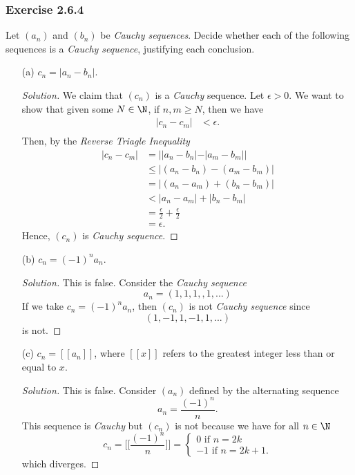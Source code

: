 \subsubsection{Exercise 2.6.4} Let \((a_n)\) and \((b_n)\) be \textit{Cauchy sequences}. Decide whether each of the following sequences is a \textit{Cauchy sequence}, justifying each conclusion.
\begin{enumerate}
    \item[(a)] \( c_n = |a_n - b_n|.\)
        \begin{proof}[Solution]
        We claim that \((c_n)\) is a \textit{Cauchy} sequence. Let \(\epsilon > 0 \). We want to show that 
        given some \(N \in \N \), if \(n,m \geq N \), then we have 
        \begin{align*}
            |c_n - c_m |&< \epsilon. \\
        \end{align*}
        Then, by the \textit{Reverse Triagle Inequality} 
        \begin{align*}
            |c_n - c_m |&= ||a_n - b_n| - |a_m - b_m || \\
                        &\leq | (a_n - b_n) - (a_m - b_m) | \\
                        &= | (a_n - a_m ) + (b_n - b_m)| \\
                        &< |a_n - a_m| + |b_n - b_m| \\
                        &= \frac{\epsilon}{2} + \frac{\epsilon}{2} \\
                        &= \epsilon.
        \end{align*}
        Hence, \((c_n)\) is \textit{Cauchy sequence}.
        \end{proof}
    \item[(b)] \(c_n = (-1)^n a_n \).
        \begin{proof}[Solution]
        This is false. Consider the \textit{Cauchy sequence} 
        \[ a_n = (1,1,1,,1, ...)\]
        If we take \(c_n = (-1)^n a_n \), then \((c_n)\) is not \textit{Cauchy sequence} since \[(1, -1, 1, -1, 1,...)\] 
        is not.
        \end{proof}
    \item[(c)] \(c_n = [[a_n]]\), where \([[x]]\) refers to the greatest integer less than or equal to \(x\).
        \begin{proof}[Solution]
        This is false. Consider \((a_n)\) defined by the alternating sequence 
        \[ a_n = \frac{(-1)^n}{n}.\]
        This sequence is \textit{Cauchy} but \((c_n)\) is not because we have for all \(n \in \N\)
        \[ c_n = \Big[ \Big[  \frac{(-1)^n}{n} \Big] \Big] = 
        \begin{cases}
            0 \text{ if } n=2k \\
            -1  \text{ if } n=2k+1.
        \end{cases}\]
        which diverges.
        \end{proof}
\end{enumerate}

